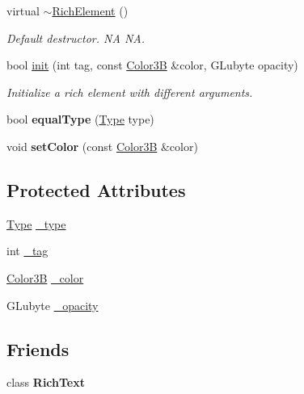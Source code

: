 \begin{DoxyCompactItemize}
\mbox{\label{classui_1_1RichElement_a214de95b7f746adf5f27ac977a3f7b7c}} 
virtual \hyperlink{classui_1_1RichElement_a214de95b7f746adf5f27ac977a3f7b7c}{$\sim$\+Rich\+Element} ()
\begin{DoxyCompactList}\small\item\em Default destructor.  NA  NA. \end{DoxyCompactList}\item 
bool \hyperlink{classui_1_1RichElement_a655a859085b249bdbc63cb54104d169a}{init} (int tag, const \hyperlink{structColor3B}{Color3B} \&color, G\+Lubyte opacity)
\begin{DoxyCompactList}\small\item\em Initialize a rich element with different arguments. \end{DoxyCompactList}\item 
\mbox{\label{classui_1_1RichElement_a98137aa6f7c6cd97c555eebb35d1403f}} 
bool {\bfseries equal\+Type} (\hyperlink{classui_1_1RichElement_a6840f6ae352b476f553659d9ecbf48c3}{Type} type)
\item 
\mbox{\label{classui_1_1RichElement_ae7c59dd4612a3b2655adb85d90a93544}} 
void {\bfseries set\+Color} (const \hyperlink{structColor3B}{Color3B} \&color)
\end{DoxyCompactItemize}
\subsection*{Protected Attributes}
\begin{DoxyCompactItemize}
\item 
\hyperlink{classui_1_1RichElement_a6840f6ae352b476f553659d9ecbf48c3}{Type} \hyperlink{classui_1_1RichElement_afdd04e534f90d73d1a818679d685f7df}{\+\_\+type}
\item 
int \hyperlink{classui_1_1RichElement_af93263bc6c857cb237e43d3f8f766232}{\+\_\+tag}
\item 
\hyperlink{structColor3B}{Color3B} \hyperlink{classui_1_1RichElement_a0952687f057209222946ef5f25109eed}{\+\_\+color}
\item 
G\+Lubyte \hyperlink{classui_1_1RichElement_a2b4a9df3c909dcdfccad85e200ee6986}{\+\_\+opacity}
\end{DoxyCompactItemize}
\subsection*{Friends}
\begin{DoxyCompactItemize}
\item 
\mbox{\label{classui_1_1RichElement_a0e450ad30cc76fbbd86270e035cc8790}} 
class {\bfseries Rich\+Text}
\end{DoxyCompactItemize}
